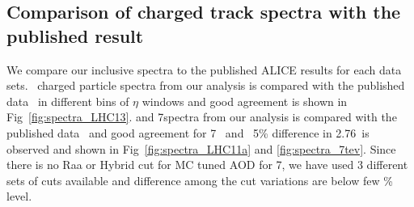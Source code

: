\documentclass[ALICE,manyauthors]{ALICE_internal_notes}
\begin{document}
\newpage

\subsection{Comparison of charged track \pt{} spectra with the published result}
\label{sec:spectracomparison}

We compare our inclusive spectra to the published ALICE results for each data sets.
\ppb\ charged particle spectra from our analysis is compared with the published data~\cite{Abelev:2014dsa} in different bins of $\eta$ windows and good agreement is shown in Fig~\ref{fig:spectra_LHC13}.
\pp {} and 7\tev spectra from our analysis is compared with the published data~\cite{Abelev:2013ala} and good agreement for 7 \tev\ and ~5\% difference in 2.76\tev\ is observed and shown
in Fig~\ref{fig:spectra_LHC11a} and \ref{fig:spectra_7tev}. Since there is no Raa or Hybrid cut for MC tuned AOD for 7\tev, we have used 3 different sets of cuts available and difference among the cut variations
are below few \% level.
\end{document}
